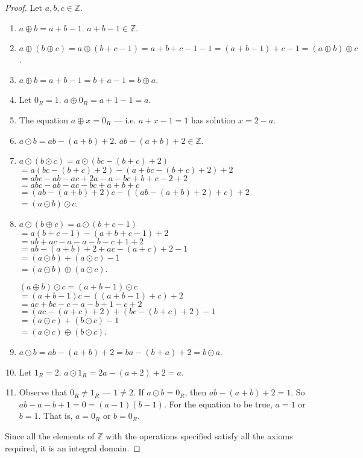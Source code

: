 \documentclass[12pt]{article}
\newcommand{\zee}{\mathbb{Z}}
\begin{document}
\begin{itemize}
\begin{proof}
  Let $a, b, c \in \zee$.
  \begin{enumerate}
    \item $a \oplus b = a+b-1$. $a+b-1 \in \zee$.
    \item $a \oplus (b \oplus c) = a \oplus (b+c-1) = a+b+c-1-1 = (a+b-1)+c-1 = (a \oplus b) \oplus c$.
    \item $a \oplus b = a+b-1 = b+a-1 = b \oplus a$.
    \item Let $0_R = 1$. $a \oplus 0_R = a+1-1 = a$.
    \item The equation $a \oplus x = 0_R$ --- i.e. $a+x-1=1$ has solution $x=2-a$.
    \item $a \odot b = ab-(a+b)+2$. $ab-(a+b)+2 \in \zee$.
    \item $a \odot (b \odot c) = a \odot (bc-(b+c)+2)$ \\
          $= a(bc-(b+c)+2)-(a+bc-(b+c)+2)+2$ \\
          $= abc-ab-ac+2a-a-bc+b+c-2+2$ \\
          $= abc-ab-ac-bc+a+b+c$ \\
          $= (ab-(a+b)+2)c-((ab-(a+b)+2)+c)+2$ \\
          $= (a \odot b) \odot c$.
    \item $a \odot (b \oplus c) = a \odot (b+c-1)$ \\
          $= a(b+c-1)-(a+b+c-1)+2$ \\
          $= ab+ac-a-a-b-c+1+2$ \\
          $= ab-(a+b)+2 + ac-(a+c)+2 -1$ \\
          $= (a \odot b) + (a \odot c) - 1$ \\
          $= (a \odot b) \oplus (a \odot c)$.
          \par
          $(a \oplus b) \odot c = (a+b-1) \odot c $ \\
          $= (a+b-1)c - ((a+b-1)+c) + 2$ \\
          $= ac+bc-c-a-b+1-c+2$ \\
          $= (ac-(a+c)+2) + (bc-(b+c)+2) -1$ \\
          $= (a \odot c) + (b \odot c) - 1$ \\
          $= (a \odot c) \oplus (b \odot c)$.
    \item $a \odot b = ab-(a+b)+2 = ba-(b+a)+2 = b \odot a$.
    \item Let $1_R = 2$. $a \odot 1_R = 2a-(a+2)+2 = a$.
    \item Observe that $0_R \neq 1_R$ --- $1 \neq 2$. If $a \odot b = 0_R$, then $ab-(a+b)+2=1$.
          So $ab-a-b+1 = 0 = (a-1)(b-1)$. For the equation to be true, $a=1$ or $b=1$.
          That is, $a=0_R$ or $b=0_R$.
  \end{enumerate}
  Since all the elements of $\zee$ with the operations specified satisfy all the axioms required, it is an integral domain.
\end{proof}


\end{itemize}
\end{document}
